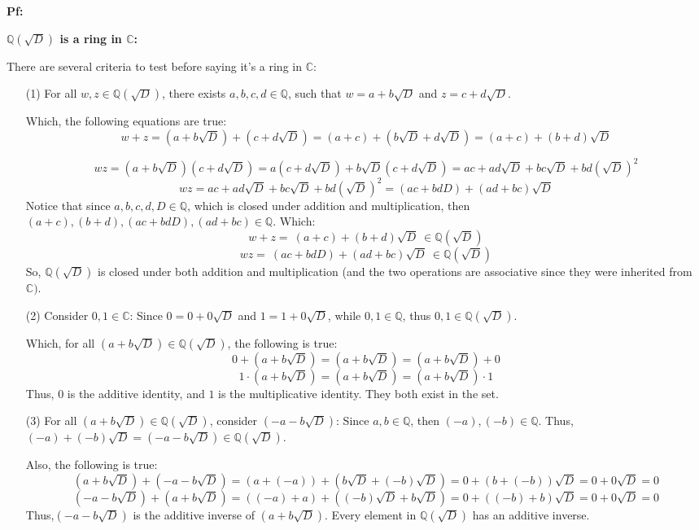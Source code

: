 \documentclass{article}
\begin{document}
\textbf{Pf:}

\textbf{$\mathbb{Q}(\sqrt{D})$ is a ring in $\mathbb{C}$:}

There are several criteria to test before saying it's a ring in $\mathbb{C}$:
\begin{itemize}
    \item[(1)] For all $w,z\in \mathbb{Q}(\sqrt{D})$,
    there exists $a,b,c,d \in \mathbb{Q}$, such that $w=a+b\sqrt{D}$ and $z=c+d\sqrt{D}$.

    Which, the following equations are true:
    $$w+z=(a+b\sqrt{D})+(c+d\sqrt{D})=(a+c)+(b\sqrt{D}+d\sqrt{D}) = (a+c)+(b+d)\sqrt{D}$$

    $$wz = (a+b\sqrt{D})(c+d\sqrt{D})=a(c+d\sqrt{D})+b\sqrt{D}(c+d\sqrt{D}) = ac+ad\sqrt{D} + bc\sqrt{D}+bd(\sqrt{D})^2$$
    $$wz= ac+ad\sqrt{D} + bc\sqrt{D}+bd(\sqrt{D})^2 = (ac+bdD)+(ad+bc)\sqrt{D}$$
    Notice that since $a,b,c,d,D\in\mathbb{Q}$, which is closed under addition and multiplication, then $(a+c),(b+d),(ac+bdD),(ad+bc)\in\mathbb{Q}$.
    Which:
    $$w+z=\ (a+c)+(b+d)\sqrt{D}\  \in \mathbb{Q}(\sqrt{D})$$ 
    $$wz =\ (ac+bdD)+(ad+bc)\sqrt{D}\ \in \mathbb{Q}(\sqrt{D})$$
    So, $\mathbb{Q}(\sqrt{D})$ is closed under both addition and multiplication (and the two operations are associative since they were inherited from $\mathbb{C})$.
    
    \hfill

    \item[(2)] Consider $0,1\in\mathbb{C}$: Since $0 = 0+0\sqrt{D}$ and $1=1+0\sqrt{D}$, while $0,1\in\mathbb{Q}$, thus $0,1\in \mathbb{Q}(\sqrt{D})$.

    Which, for all $(a+b\sqrt{D})\in\mathbb{Q}(\sqrt{D})$, the following is true:
    $$0+(a+b\sqrt{D})=(a+b\sqrt{D})=(a+b\sqrt{D})+0$$
    $$1\cdot(a+b\sqrt{D})=(a+b\sqrt{D})=(a+b\sqrt{D})\cdot 1$$
    Thus, $0$ is the additive identity, and $1$ is the multiplicative identity. They both exist in the set.

    \hfill

    \item[(3)] For all $(a+b\sqrt{D})\in\mathbb{Q}(\sqrt{D})$, consider $(-a-b\sqrt{D})$:
    Since $a,b\in\mathbb{Q}$, then $(-a),(-b)\in\mathbb{Q}$. Thus, $(-a)+(-b)\sqrt{D}=(-a-b\sqrt{D})\in\mathbb{Q}(\sqrt{D})$.

    Also, the following is true:
    $$(a+b\sqrt{D}) + (-a-b\sqrt{D}) = (a+(-a))+(b\sqrt{D}+(-b)\sqrt{D}) = 0+(b+(-b))\sqrt{D} = 0+0\sqrt{D} = 0$$
    $$(-a-b\sqrt{D})+(a+b\sqrt{D}) = ((-a)+a)+((-b)\sqrt{D}+b\sqrt{D})=0+((-b)+b)\sqrt{D} = 0+0\sqrt{D}=0$$
    Thus,$(-a-b\sqrt{D})$ is the additive inverse of $(a+b\sqrt{D})$. Every element in $\mathbb{Q}(\sqrt{D})$ has an additive inverse.
\end{itemize}
\end{document}
